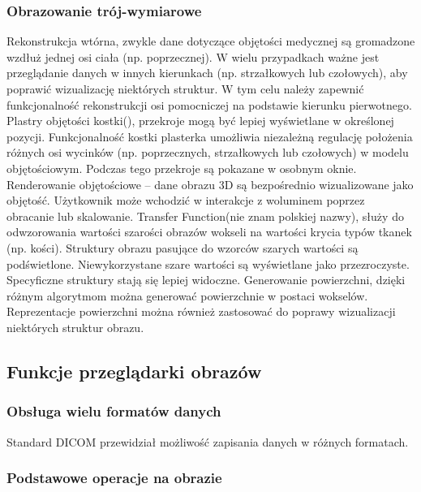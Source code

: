 \subsubsection{Obrazowanie trój-wymiarowe}

Rekonstrukcja wtórna, zwykle dane dotyczące objętości medycznej są gromadzone wzdłuż jednej osi ciała (np. poprzecznej).
W wielu przypadkach ważne jest przeglądanie danych w innych kierunkach (np. strzałkowych lub czołowych), aby poprawić wizualizację niektórych struktur.
W tym celu należy zapewnić funkcjonalność rekonstrukcji osi pomocniczej na podstawie kierunku pierwotnego.
Plastry objętości kostki(), przekroje mogą być lepiej wyświetlane w określonej pozycji.
Funkcjonalność kostki plasterka umożliwia niezależną regulację położenia różnych osi wycinków (np. poprzecznych, strzałkowych lub czołowych) w modelu objętościowym.
Podczas tego przekroje są pokazane w osobnym oknie.
Renderowanie objętościowe – dane obrazu 3D są bezpośrednio wizualizowane jako objętość.
Użytkownik może wchodzić w interakcje z woluminem poprzez obracanie lub skalowanie.
Transfer Function(nie znam polskiej nazwy), służy do odwzorowania wartości szarości obrazów wokseli na wartości krycia typów tkanek (np. kości). Struktury obrazu pasujące do wzorców szarych wartości są podświetlone. Niewykorzystane szare wartości są wyświetlane jako
przezroczyste. Specyficzne struktury stają się lepiej widoczne.
Generowanie powierzchni, dzięki różnym algorytmom można generować powierzchnie w postaci wokselów. Reprezentacje powierzchni można również zastosować do poprawy wizualizacji niektórych struktur obrazu.

\subsection{Funkcje przeglądarki obrazów}

\subsubsection{Obsługa wielu formatów danych}

Standard DICOM przewidział możliwość zapisania danych w różnych formatach.

\subsubsection{Podstawowe operacje na obrazie}

